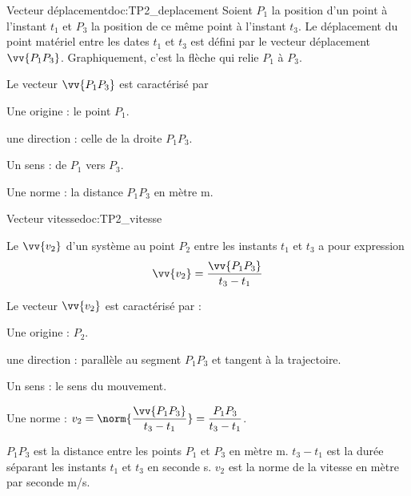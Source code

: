 \newpage
\vspace*{-40pt}
\begin{doc}{Vecteur déplacement}{doc:TP2_deplacement}
  Soient $P_1$ la position d'un point à l'instant $t_1$ et $P_3$ la position de ce même point à l'instant $t_3$.
  Le déplacement du point matériel entre les dates $t_1$ et $t_3$ est défini par le vecteur déplacement $\vv{P_1 P_3}$.
  Graphiquement, c'est la flèche qui relie $P_1$ à $P_3$. 
  
  Le vecteur $\vv{P_1 P_3}$ est caractérisé par
  \vspace*{-8pt}
  \begin{multicols}{2}
  \begin{listePoints}
    \item Une origine : le point $P_1$.
    \item une direction : celle de la droite $P_1 P_3$.
    \item Un sens : de $P_1$ vers $P_3$.
    \item Une norme : la distance $P_1 P_3$ en mètre \unit{m}.
  \end{listePoints}
  \end{multicols}
\end{doc}

\begin{doc}{Vecteur vitesse}{doc:TP2_vitesse}
  \begin{encart}
    Le  $\vv{v_2}$ d'un système au point $P_2$ entre les instants $t_1$ et $t_3$ a pour expression
    \begin{equation*}
      \vv{v_2} = \frac{\vv{P_1 P_3}}{t_3 - t_1}
    \end{equation*}
  \end{encart}
  
  Le vecteur $\vv{v_2}$ est caractérisé par :
  \vspace*{-8pt}
  \begin{multicols}{2}
  \begin{listePoints}
    \item Une origine : $P_2$.
    \item une direction : parallèle au segment $P_1 P_3$ et tangent à la trajectoire.
    \item Un sens : le sens du mouvement.
    \item Une norme : $v_2 
    = \displaystyle \norm{\frac{\vv{P_1 P_3}}{t_3 - t_1}}
    = \displaystyle \frac{P_1 P_3}{t_3 - t_1}$.
  \end{listePoints}
  \end{multicols}
  
  $P_1 P_3$ est la distance entre les points $P_1$ et $P_3$ en mètre \unit{\m}.
  $t_3 - t_1$ est la durée séparant les instants $t_1$ et $t_3$ en seconde \unit{\s}.
  $v_2$ est la norme de la vitesse en mètre par seconde \unit{\m/\s}.
\end{doc}



